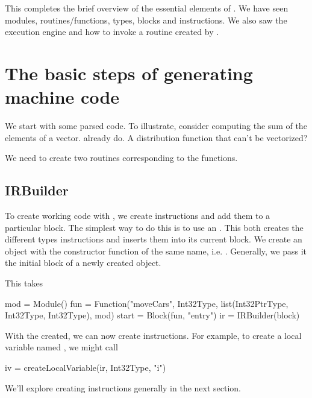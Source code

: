 \documentclass[article]{jss}
\begin{document}
This completes the brief overview of the essential elements of \llvm.
We have seen modules, routines/functions, types, blocks and
instructions.  We also saw the execution engine and how to 
invoke a routine created by \llvm.


\section{The basic steps of generating machine code}

We start with some parsed code.  To illustrate, consider computing the
sum of the elements of a vector. %
already do. A distribution function that can't be vectorized?%

We need to create two routines corresponding to the \R{} functions.






\subsection{IRBuilder}
To create working code with \llvm, we create instructions and add them
to a particular block.  The simplest way to do this is to use an
.  This both creates the different types
instructions and inserts them into its current block.  We create an
 object with the constructor function of the same
name, i.e. .  Generally, we pass it the initial block
of a newly created  object.

This takes 
\begin{RCode}
mod = Module()
fun = Function("moveCars", Int32Type, list(Int32PtrType, Int32Type, Int32Type), mod)
start = Block(fun, "entry")
ir = IRBuilder(block)  
\end{RCode}

With the  created, we can now create instructions.
For example, to create a local variable named , we might
call
\begin{RCode}
iv = createLocalVariable(ir, Int32Type, "i")  
\end{RCode}
We'll explore creating instructions generally in the next
section. 
\end{document}
